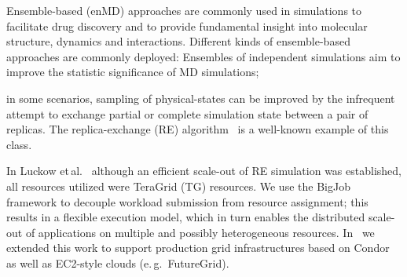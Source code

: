 \documentclass[conference,final]{IEEEtran}
\newcommand{\alnote}[1]{ {\textcolor{blue} { ***AL: #1 }}}
\newcommand{\jhanote}[1]{ {\textcolor{red} { ***SJ: #1 }}}
\newcommand{\alnote}[1]{}
\newcommand{\jhanote}[1]{}
\begin{document}
 





 



Ensemble-based (enMD) approaches are commonly used in simulations to
facilitate drug discovery and to provide fundamental insight into
molecular structure, dynamics and interactions.  Different kinds of
ensemble-based approaches are commonly deployed: Ensembles of
independent simulations aim to improve the statistic significance of
MD simulations; 

in some scenarios, sampling of physical-states can be improved by the
infrequent attempt to exchange partial or complete simulation state
between a pair of replicas. The replica-exchange (RE)
algorithm~\cite{hansmann} is a well-known example of this class. 

In Luckow et\,al.~\cite{repex_ptrsb} although an efficient scale-out
of RE simulation was established, all resources utilized were TeraGrid
(TG) resources. We use the BigJob framework to decouple workload
submission from resource assignment; this results in a flexible
execution model, which in turn enables the distributed scale-out of
applications on multiple and possibly heterogeneous resources.
In~\cite{10.1109/CCGRID.2010.91} we extended this work to support
production grid infrastructures based on Condor as well as EC2-style
clouds (e.\,g.\ FutureGrid).
 
\end{document}
